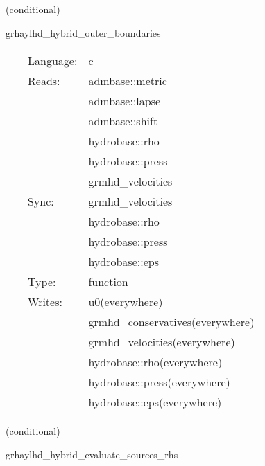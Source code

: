 \documentclass{article}
\begin{document}
\vspace{5mm}

   (conditional) 

\hspace{5mm} grhaylhd\_hybrid\_outer\_boundaries 

\hspace{5mm}{\it hybrid version of grhaylhd\_outer\_boundaries } 


\hspace{5mm}

 \begin{tabular*}{160mm}{cll} 
~ & Language:  & c \\ 
~ & Reads:  & admbase::metric \\ 
~& ~ &admbase::lapse\\ 
~& ~ &admbase::shift\\ 
~& ~ &hydrobase::rho\\ 
~& ~ &hydrobase::press\\ 
~& ~ &grmhd\_velocities\\ 
~ & Sync:  & grmhd\_velocities \\ 
~& ~ &hydrobase::rho\\ 
~& ~ &hydrobase::press\\ 
~& ~ &hydrobase::eps\\ 
~ & Type:  & function \\ 
~ & Writes:  & u0(everywhere) \\ 
~& ~ &grmhd\_conservatives(everywhere)\\ 
~& ~ &grmhd\_velocities(everywhere)\\ 
~& ~ &hydrobase::rho(everywhere)\\ 
~& ~ &hydrobase::press(everywhere)\\ 
~& ~ &hydrobase::eps(everywhere)\\ 
\end{tabular*} 


\vspace{5mm}

   (conditional) 

\hspace{5mm} grhaylhd\_hybrid\_evaluate\_sources\_rhs 

\hspace{5mm}{\it hybrid version of grhaylhd\_evaluate\_sources\_rhs } 


\hspace{5mm}
\end{document}

